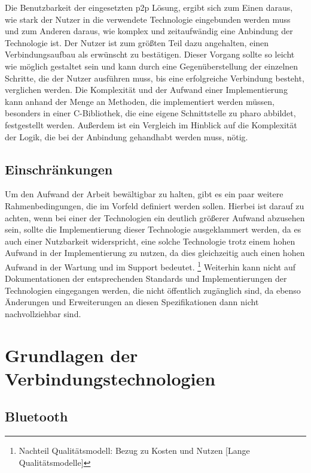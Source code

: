 \documentclass[12pt,a4paper]{article}
\begin{document}
\begin{enumerate}
    	Die Benutzbarkeit der eingesetzten p2p Lösung, ergibt sich zum Einen daraus, wie stark der Nutzer in die verwendete Technologie eingebunden werden muss und zum Anderen daraus, wie komplex und zeitaufwändig eine Anbindung der Technologie ist.
    	Der Nutzer ist zum größten Teil dazu angehalten, einen Verbindungsaufbau als erwünscht zu bestätigen. Dieser Vorgang sollte so leicht wie möglich gestaltet sein und kann durch eine Gegenüberstellung der einzelnen Schritte, die der Nutzer ausführen muss, bis eine erfolgreiche Verbindung besteht, verglichen werden.
    	Die Komplexität und der Aufwand einer Implementierung kann anhand der Menge an Methoden, die implementiert werden müssen, besonders in einer C-Bibliothek, die eine eigene Schnittstelle zu pharo abbildet, festgestellt werden. Außerdem ist ein Vergleich im Hinblick auf die Komplexität der Logik, die bei der Anbindung gehandhabt werden muss, nötig.
    	\end{enumerate}
    	
		\subsection{Einschränkungen}
		Um den Aufwand der Arbeit bewältigbar zu halten, gibt es ein paar weitere Rahmenbedingungen, die im Vorfeld definiert werden sollen. Hierbei ist darauf zu achten, wenn bei einer der Technologien ein deutlich größerer Aufwand abzusehen sein, sollte die Implementierung dieser Technologie ausgeklammert werden, da es auch einer Nutzbarkeit widerspricht, eine solche Technologie trotz einem hohen Aufwand in der Implementierung zu nutzen, da dies gleichzeitig auch einen hohen Aufwand in der Wartung und im Support bedeutet. \footnote{Nachteil Qualitätsmodell: Bezug zu Kosten und Nutzen [Lange Qualitätsmodelle]}
		Weiterhin kann nicht auf Dokumentationen der entsprechenden Standards und Implementierungen der Technologien eingegangen werden, die nicht öffentlich zugänglich sind, da ebenso Änderungen und Erweiterungen an diesen Spezifikationen dann nicht nachvollziehbar sind.
		
		\section{Grundlagen der Verbindungstechnologien}
		
		\subsection{Bluetooth}
		
\end{document}
